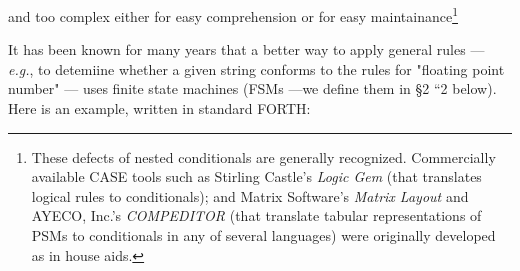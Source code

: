 and too complex either for easy comprehension or for easy maintainance\footnote{These defects of nested conditionals are generally recognized. Commercially available CASE tools such as Stirling Castle’s \textit{Logic Gem} (that translates logical rules to conditionals); and Matrix Software's \textit{Matrix Layout} and AYECO, Inc.'s \textit{COMPEDITOR} (that translate tabular representations of PSMs to conditionals in any of several languages) were originally developed as in house aids.}

It has been known for many years that a better way to apply general rules — \textit{e.g.}, to detemiine whether a given string conforms to the rules for "floating point number" --- uses finite state machines (FSMs —we define them in §2 “2 below). Here is an example, written in standard FORTH:

